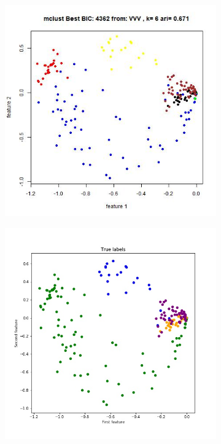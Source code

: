 \documentclass{article}
\begin{document}
\begin{figure}[h!]
\begin{subfigure}[b]{0.3\linewidth}
  \includegraphics[width=\linewidth]{r_bic_k6.jpg}
\end{subfigure}
\begin{subfigure}[b]{0.3\linewidth}
  \includegraphics[width=\linewidth]{true.jpg}

\end{subfigure}
\end{figure}
\end{document}
